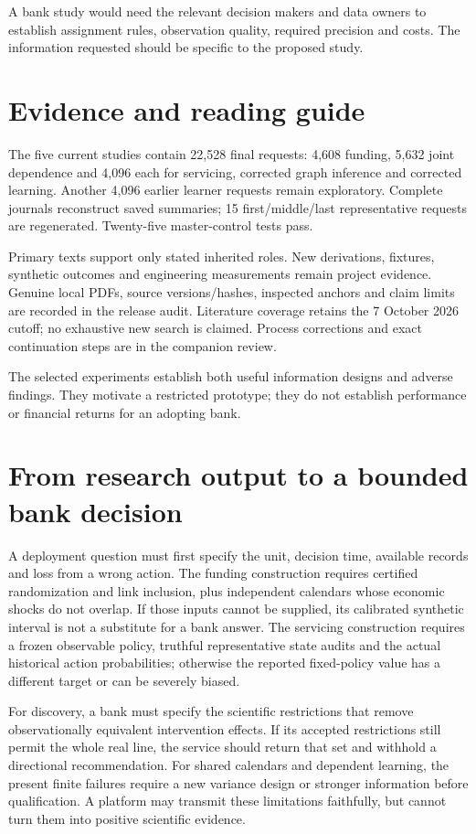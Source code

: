 A bank study would need the relevant decision makers and data owners
to establish assignment rules, observation quality, required precision and
costs. The information requested should be specific to the proposed study.

\section*{Evidence and reading guide}
The five current studies contain 22,528 final requests: 4,608 funding, 5,632 joint dependence and 4,096 each for servicing, corrected graph inference and corrected learning. Another 4,096 earlier learner requests remain exploratory. Complete journals reconstruct saved summaries; 15 first/middle/last representative requests are regenerated. Twenty-five master-control tests pass.

Primary texts support only stated inherited roles. New derivations, fixtures, synthetic outcomes and engineering measurements remain project evidence. Genuine local PDFs, source versions/hashes, inspected anchors and claim limits are recorded in the release audit. Literature coverage retains the 7 October 2026 cutoff; no exhaustive new search is claimed. Process corrections and exact continuation steps are in the companion review.

The selected experiments establish both useful information designs
and adverse findings. They motivate a restricted prototype; they do not
establish performance or financial returns for an adopting bank.

\section*{From research output to a bounded bank decision}
A deployment question must first specify the unit, decision time, available records and loss from a wrong action. The funding construction requires certified randomization and link inclusion, plus independent calendars whose economic shocks do not overlap. If those inputs cannot be supplied, its calibrated synthetic interval is not a substitute for a bank answer. The servicing construction requires a frozen observable policy, truthful representative state audits and the actual historical action probabilities; otherwise the reported fixed-policy value has a different target or can be severely biased.

For discovery, a bank must specify the scientific restrictions that remove observationally equivalent intervention effects. If its accepted restrictions still permit the whole real line, the service should return that set and withhold a directional recommendation. For shared calendars and dependent learning, the present finite failures require a new variance design or stronger information before qualification. A platform may transmit these limitations faithfully, but cannot turn them into positive scientific evidence.

